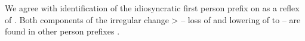 


We agree with  identification of the idiosyncratic \akuriyo first person prefix  on  as a reflex of .
Both components of the irregular change  >  -- loss of  and lowering of  to  -- are found in other person prefixes .


